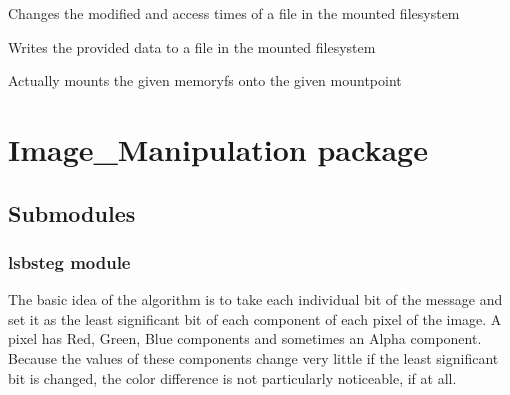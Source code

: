 \documentclass[letterpaper,12pt,openany,oneside]{sphinxmanual}
\begin{document}
\begin{fulllineitems}
\begin{fulllineitems}
\end{fulllineitems}


\begin{fulllineitems}
\label{File_System:File_System.memfuse.MemFS.utimens}
Changes the modified and access times of a file in the mounted filesystem

\end{fulllineitems}


\begin{fulllineitems}
\label{File_System:File_System.memfuse.MemFS.write}
Writes the provided data to a file in the mounted filesystem

\end{fulllineitems}


\end{fulllineitems}


\begin{fulllineitems}
\label{File_System:File_System.memfuse.mount}
Actually mounts the given memoryfs onto the given mountpoint

\end{fulllineitems}



\section{Image\_Manipulation package}
\label{Image_Manipulation::doc}\label{Image_Manipulation:image-manipulation-package}

\subsection{Submodules}
\label{Image_Manipulation:submodules}

\subsubsection{lsbsteg module}
\label{Image_Manipulation:lsbsteg-module}\label{Image_Manipulation:module-Image_Manipulation.lsbsteg}
The basic idea of the algorithm is to take each individual bit of the message
and set it as the least significant bit of each component of each pixel of the
image. A pixel has Red, Green, Blue components and sometimes an Alpha
component. Because the values of these components change very little if the
least significant bit is changed, the color difference is not particularly
noticeable, if at all.
\end{document}
